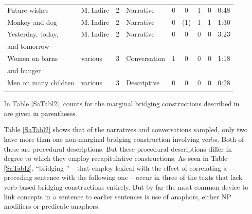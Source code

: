 \documentclass[output=paper]{LSP/langsci}
\begin{document}
\begin{table}
\begin{tabular}{llclccrcd{2}}
Future wishes              & M. Indire        & 2     & Narrative      & 0                    & 0                     & 1                & 0                  & 0:48             \\
Monkey and dog             & M. Indire        & 2     & Narrative      & 0                    & (1)                   & 1                & 1                  & 1:30             \\
Yesterday, today,  & M. Indire        & 2     & Narrative      & 0                    & 0                     & 0                & 0                  & 3:23             \\
and tomorrow &         &      &       &                     &                      &                 &                   &             \\
Women on barns   & various          & 3       & Conversation  & 1                    & 0                     & 0                & 0                  & 1:18             \\
 and hunger  &           &        &   &                     &                      &                 &                   &           \\
Men on many children       & various          & 3      & Descriptive    & 0                    & 0                     & 0                & 0                  & 0:28        \\  
\lspbottomrule  
\end{tabular}
\end{table}
%

In Table \ref{SaTabl2}, counts for the marginal bridging constructions described in  are given in parentheses.  
 
Table \ref{SaTabl2} shows that of the narratives and conversations sampled, only two have more than one non-marginal bridging construction involving verbs. Both of these are procedural descriptions. But these procedural descriptions differ in degree to which they employ recapitulative constructions. As seen in Table \ref{SaTabl2}, ``bridging '' --  that employ lexical  with the effect of correlating a preceding sentence with the following one -- occur in three of the texts that lack verb-based bridging constructions entirely. But by far the most common device to link concepts in a sentence to earlier sentences is use of anaphors, either NP modifiers or predicate anaphors. 
\end{document}
